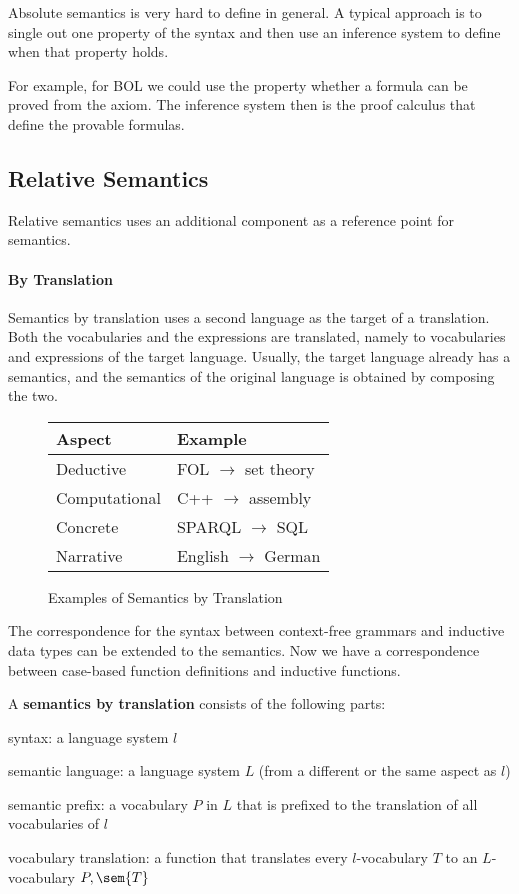 Absolute semantics is very hard to define in general.
A typical approach is to single out one property of the syntax and then use an inference system to define when that property holds.

For example, for BOL we could use the property whether a formula can be proved from the axiom.
The inference system then is the proof calculus that define the provable formulas.

\subsection{Relative Semantics}

Relative semantics uses an additional component as a reference point for semantics.

\paragraph{By Translation}
Semantics by translation uses a second language as the target of a translation.
Both the vocabularies and the expressions are translated, namely to vocabularies and expressions of the target language.
Usually, the target language already has a semantics, and the semantics of the original language is obtained by composing the two.

\begin{figure}[hbt]
\begin{center}
\begin{tabular}{l|l}
Aspect & Example\\\hline
Deductive & FOL $\to$ set theory\\
Computational & C++ $\to$ assembly \\
Concrete & SPARQL $\to$ SQL \\
Narrative & English $\to$ German \\
\end{tabular}
\caption{Examples of Semantics by Translation}\label{fig:trans}
\end{center}
\end{figure}

The correspondence for the syntax between context-free grammars and inductive data types can be extended to the semantics.
Now we have a correspondence between case-based function definitions and inductive functions.

\begin{definition}
A \textbf{semantics by translation} consists of the following parts:
\begin{compactitem}
 \item syntax: a language system $l$
 \item semantic language: a language system $L$ (from a different or the same aspect as $l$)
 \item semantic prefix: a vocabulary $P$ in $L$ that is prefixed to the translation of all vocabularies of $l$
 \item vocabulary translation: a function that translates every $l$-vocabulary $T$ to an $L$-vocabulary $P,\sem{T}$
\end{compactitem}
\end{definition}

